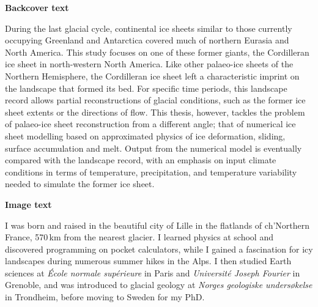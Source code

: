 \documentclass{minimal}
\begin{document}
\textbf{Backcover text}

During the last glacial cycle, continental ice sheets similar to those
currently occupying Greenland and Antarctica covered much of northern Eurasia
and North America. This study focuses on one of these former giants, the
Cordilleran ice sheet in north-western North America. Like other palaeo-ice
sheets of the Northern Hemisphere, the Cordilleran ice sheet left a
characteristic imprint on the landscape that formed its bed. For specific time
periods, this landscape record allows partial reconstructions of glacial
conditions, such as the former ice sheet extents or the directions of flow.
This thesis, however, tackles the problem of palaeo-ice sheet reconstruction
from a different angle; that of numerical ice sheet modelling based on
approximated physics of ice deformation, sliding, surface accumulation and
melt. Output from the numerical model is eventually compared with the landscape
record, with an emphasis on input climate conditions in terms of temperature,
precipitation, and temperature variability needed to simulate the former ice
sheet.

\bigskip

\textbf{Image text}

I was born and raised in the beautiful city of Lille in the flatlands of
ch'Northern France, 570\,km from the nearest glacier. I learned physics at
school and discovered programming on pocket calculators, while I gained a
fascination for icy landscapes during numerous summer hikes in the Alps. I then
studied Earth sciences at \emph{École normale supérieure} in Paris and
\emph{Université Joseph Fourier} in Grenoble, and was introduced to glacial geology at
\emph{Norges geologiske undersøkelse} in Trondheim, before moving to Sweden for
my PhD.
\end{document}
